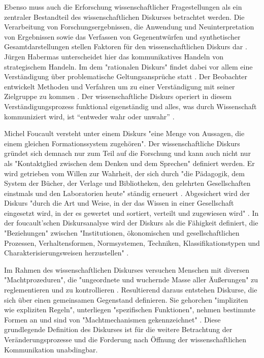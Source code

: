 Ebenso muss auch die Erforschung wissenschaftlicher Fragestellungen als ein zentraler Bestandteil des wissenschaftlichen Diskurses \cite{suchen} betrachtet werden. Die Verarbeitung von Forschungsergebnissen, die Anwendung und Neuinterpretation von Ergebnissen sowie das Verfassen von Gegenentwürfen und synthetischer Gesamtdarstellungen stellen Faktoren für den wissenschaftlichen Diskurs dar \cite{suchen}. Jürgen Habermas unterscheidet hier das kommunikatives Handeln von strategischem Handeln. Im dem "rationalen Diskurs" findet dabei vor allem eine Verständigung über problematische Geltungsansprüche statt \cite{suchen}. Der Beobachter entwickelt Methoden und Verfahren um zu einer Verständigung mit seiner Zielgruppe zu kommen \cite{suchen}. Der wissenschaftliche Diskurs operiert in diesem Verständigungsprozess funktional eigenständig und alles, was durch Wissenschaft kommuniziert wird, ist “entweder wahr oder unwahr” \cite{Luhmann1998}.

Michel Foucault versteht unter einem Diskurs "eine Menge von Aussagen, die einem gleichen Formationssystem zugehören"\cite{foucault_archaologie_1981}. Der wissenschaftliche Diskurs gründet sich demnach nur zum Teil auf die Forschung und kann auch nicht nur als "Kontaktglied zwischen dem Denken und dem Sprechen" \cite{foucault_ordnung_2003} definiert werden. Er wird getrieben vom Willen zur Wahrheit, der sich durch "die Pädagogik, dem System der Bücher, der Verlage und Bibliotheken, den gelehrten Gesellschaften einstmals und den Laboratorien heute" ständig erneuert \cite{foucault_ordnung_2003}. Abgesichert wird der Diskurs "durch die Art und Weise, in der das Wissen in einer Gesellschaft eingesetzt wird, in der es gewertet und sortiert, verteilt und zugewiesen wird" \cite{foucault_ordnung_2003}. In der foucault'schen Diskursanalyse wird der Diskurs als die Fähigkeit definiert, die "Beziehungen" zwischen "Institutionen, ökonomischen und gesellschaftlichen Prozessen, Verhaltensformen, Normsystemen, Techniken, Klassifikationstypen und Charakterisierungsweisen herzustellen" \cite{foucault_archaologie_1981}.

Im Rahmen des wissenschaftlichen Diskurses versuchen Menschen mit diversen "Machtprozeduren", die "ungeordnete und wuchernde Masse aller Äußerungen" zu reglementieren und zu kontrollieren \cite{Neymeyer_diskurs_2010}. Resultierend daraus entstehen Diskurse, die sich über einen gemeinsamen Gegenstand definieren. Sie gehorchen "impliziten wie expliziten Regeln", unterliegen "spezifischen Funktionen", nehmen bestimmte Formen an und sind von "Machtmechanismen gekennzeichnet" \cite{Neymeyer_diskurs_2010}. Diese grundlegende Definition des Diskurses ist für die weitere Betrachtung der Veränderungsprozesse und die Forderung nach Öffnung der wissenschaftlichen Kommunikation unabdingbar.

